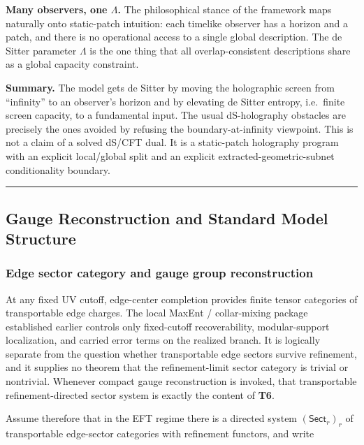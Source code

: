 \textbf{Many observers, one \(\Lambda\).} The philosophical stance of the framework maps naturally onto static-patch intuition: each timelike observer has a horizon and a patch, and there is no operational access to a single global description. The de Sitter parameter \(\Lambda\) is the one thing that all overlap-consistent descriptions share as a global capacity constraint.

\textbf{Summary.} The model gets de Sitter by moving the holographic screen from ``infinity'' to an observer's horizon and by elevating de Sitter entropy, i.e.\ finite screen capacity, to a fundamental input. The usual dS-holography obstacles are precisely the ones avoided by refusing the boundary-at-infinity viewpoint. This is not a claim of a solved dS/CFT dual. It is a static-patch holography program with an explicit local/global split and an explicit extracted-geometric-subnet conditionality boundary.

\begin{center}\rule{0.5\linewidth}{0.5pt}\end{center}
\subsection{Gauge Reconstruction and Standard Model Structure}\label{6-gauge-reconstruction-and-standard-model-structure}

\subsubsection{Edge sector category and gauge group reconstruction}\label{61-edge-sector-category-and-gauge-group-reconstruction}

At any fixed UV cutoff, edge-center completion provides finite tensor categories of transportable edge charges. The local MaxEnt / collar-mixing package established earlier controls only fixed-cutoff recoverability, modular-support localization, and carried error terms on the realized branch. It is logically separate from the question whether transportable edge sectors survive refinement, and it supplies no theorem that the refinement-limit sector category is trivial or nontrivial. Whenever compact gauge reconstruction is invoked, that transportable refinement-directed sector system is exactly the content of \textbf{T6}.

Assume therefore that in the EFT regime there is a directed system \((\mathsf{Sect}_r)_r\) of transportable edge-sector categories with refinement functors, and write

